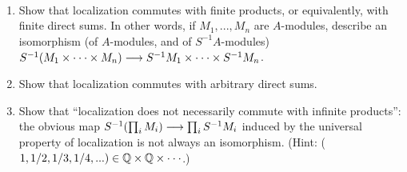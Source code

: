 \documentclass[11pt,fleqn]{book} %
\begin{document}
\begin{exr}\ 
\begin{enumerate}[label=(\alph*)]
\item Show that localization commutes with finite products, or equivalently, with
finite direct sums. In other words, if $M_1,...,M_n$ are $A$-modules, describe an isomorphism (of $A$-modules, and of $S^{-1}A$-modules) $S^{-1}(M_1 \times\cdot\cdot\cdot\times M_n) \longrightarrow S^{-1}M_1 \times
\cdot\cdot \cdot\times S^{-1}M_n$.
\item  Show that localization commutes with arbitrary direct sums.
\item Show that “localization does not necessarily commute with infinite products”:
the obvious map $S^{-1}(\prod_i M_i) \longrightarrow  \prod_i S^{-1}M_i$ induced by the universal property of
localization is not always an isomorphism. (Hint: ($1, 1/2, 1/3, 1/4,... ) \in \mathbb Q\times\mathbb Q \times \cdot\cdot\cdot$.)
\end{enumerate}
\end{exr}
\end{document}
